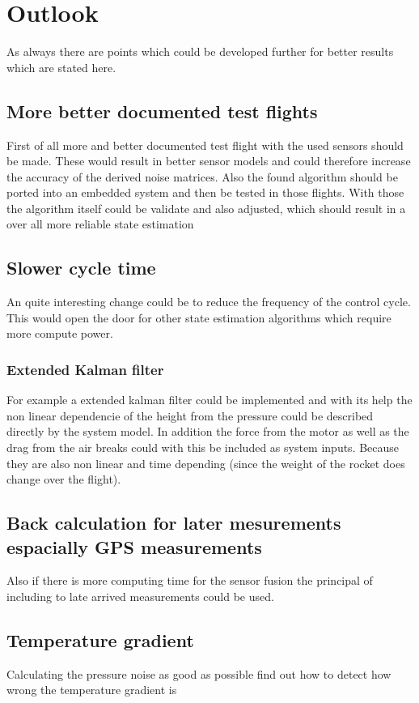 \section{Outlook}
As always there are points which could be developed further for better results which are stated here.

\subsection{More better documented test flights}
First of all more and better documented test flight with the used sensors should be made.
These would result in better sensor models and could therefore increase the accuracy of the derived noise matrices.
Also the found algorithm should be ported into an embedded system and then be tested in those flights.
With those the algorithm itself could be validate and also adjusted, which should result in a over all more reliable state estimation

\subsection{Slower cycle time}
An quite interesting change could be to reduce the frequency of the control cycle.
This would open the door for other state estimation algorithms which require more compute power.

\subsubsection{Extended Kalman filter}
For example a extended kalman filter could be implemented and with its help the non linear dependencie of the height from the pressure
could be described directly by the system model.
In addition the force from the motor as well as the drag from the air breaks could with this be included as system inputs.
Because they are also non linear and time depending (since the weight of the rocket does change over the flight).

\subsection{Back calculation for later mesurements espacially GPS measurements}
Also if there is more computing time for the sensor fusion the principal of including to late arrived measurements could be used.

\subsection{Temperature gradient}
Calculating the pressure noise as good as possible find out how to detect how wrong the temperature gradient is

